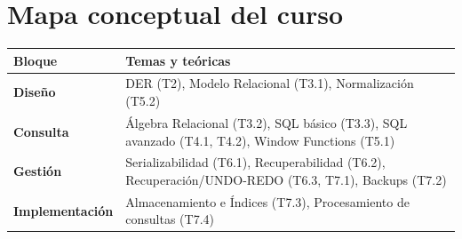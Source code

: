 \documentclass[12pt, a4paper]{article}
\begin{document}
\section*{Mapa conceptual del curso}

\begin{tabularx}{\textwidth}{lX}
\toprule
\textbf{Bloque} & \textbf{Temas y teóricas} \\
\midrule
\textbf{Diseño} & DER (T2), Modelo Relacional (T3.1), Normalización (T5.2) \\
\textbf{Consulta} & Álgebra Relacional (T3.2), SQL básico (T3.3), SQL avanzado (T4.1, T4.2), Window Functions (T5.1) \\
\textbf{Gestión} & Serializabilidad (T6.1), Recuperabilidad (T6.2), Recuperación/UNDO-REDO (T6.3, T7.1), Backups (T7.2) \\
\textbf{Implementación} & Almacenamiento e Índices (T7.3), Procesamiento de consultas (T7.4) \\
\bottomrule
\end{tabularx}
\end{document}
